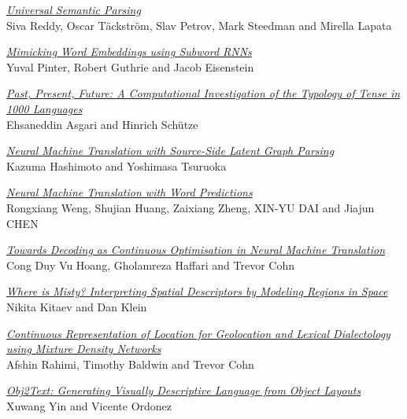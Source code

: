 \hyperlink{page.89}{\em Universal Semantic Parsing}\samepage \\
\hspace*{7mm} Siva Reddy, Oscar T\"{a}ckstr\"{o}m, Slav Petrov, Mark Steedman and Mirella Lapata\dotfill {}

\hyperlink{page.102}{\em Mimicking Word Embeddings using Subword RNNs}\samepage \\
\hspace*{7mm} Yuval Pinter, Robert Guthrie and Jacob Eisenstein\dotfill {}

\hyperlink{page.113}{\em Past, Present, Future: A Computational Investigation of the Typology of Tense in 1000 Languages}\samepage \\
\hspace*{7mm} Ehsaneddin Asgari and Hinrich Sch\"{u}tze\dotfill {}

\hyperlink{page.125}{\em Neural Machine Translation with Source-Side Latent Graph Parsing}\samepage \\
\hspace*{7mm} Kazuma Hashimoto and Yoshimasa Tsuruoka\dotfill {}

\hyperlink{page.136}{\em Neural Machine Translation with Word Predictions}\samepage \\
\hspace*{7mm} Rongxiang Weng, Shujian Huang, Zaixiang Zheng, XIN-YU DAI and Jiajun CHEN\dotfill {}

\hyperlink{page.146}{\em Towards Decoding as Continuous Optimisation in Neural Machine Translation}\samepage \\
\hspace*{7mm} Cong Duy Vu Hoang, Gholamreza Haffari and Trevor Cohn\dotfill {}

\hyperlink{page.157}{\em Where is Misty? Interpreting Spatial Descriptors by Modeling Regions in Space}\samepage \\
\hspace*{7mm} Nikita Kitaev and Dan Klein\dotfill {}

\hyperlink{page.167}{\em Continuous Representation of Location for Geolocation and Lexical Dialectology using Mixture Density Networks}\samepage \\
\hspace*{7mm} Afshin Rahimi, Timothy Baldwin and Trevor Cohn\dotfill {}

\hyperlink{page.177}{\em Obj2Text: Generating Visually Descriptive Language from Object Layouts}\samepage \\
\hspace*{7mm} Xuwang Yin and Vicente Ordonez\dotfill {}

